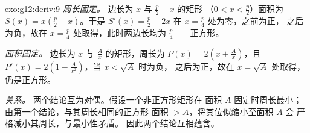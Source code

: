 \begin{solution}{exo:g12:deriv:9}
\emph{周长固定。} 边长为 $x$ 与 $\frac{p}{2} - x$ 的矩形
（$0 < x < \frac p2$）面积为 $S(x) = x\left(\frac p2 - x\right)$。于是
$S'(x) = \frac p2 - 2x$ 在 $x = \frac p4$ 处为零，之前为正，
之后为负，故在 $x = \frac{p}{4}$ 处取得，此时两边长均为
$\frac p4$——正方形。

\emph{面积固定。} 边长为 $x$ 与 $\frac Ax$ 的矩形，周长为
$P(x) = 2\left(x + \frac Ax\right)$，且
$P'(x) = 2\left(1 - \frac{A}{x^2}\right)$，当 $x < \sqrt A$ 时为负，
之后为正，故在 $x = \sqrt{A}$ 处取得，仍是正方形。

\emph{关系。} 两个结论互为对偶。假设一个非正方形矩形在
面积 $A$ 固定时周长最小；由第一个结论，与其周长相同的正方形
面积 $> A$，将其位似缩小至面积 $A$ 会
严格减小其周长，与最小性矛盾。
因此两个结论互相蕴含。
\end{solution}

